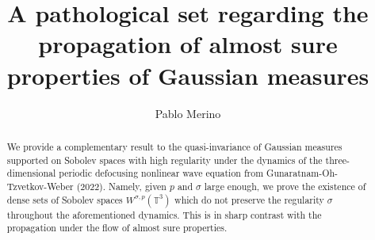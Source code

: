 \documentclass[a4paper, reqno, 11pt]{amsart}
\title[A pathological set for a.s. properties of Gaussian measures]{A pathological set regarding the propagation of almost sure properties of Gaussian measures}
\author{Pablo Merino}
\date{}
\theoremstyle{definition}
\begin{document}
	\maketitle
	
	\begin{abstract}
	We provide a complementary result to the quasi-invariance of Gaussian measures supported on Sobolev spaces with high regularity under the dynamics of the three-dimensional periodic defocusing nonlinear wave equation from Gunaratnam-Oh-Tzvetkov-Weber (2022). Namely, given $p$ and $\sigma$ large enough, we prove the existence of dense sets of Sobolev spaces $W^{\sigma,p}(\mathbb{T}^3)$ which do not preserve the regularity $\sigma$ throughout the aforementioned dynamics. This is in sharp contrast with the propagation under the flow of almost sure properties.
	\end{abstract}
	
	
	
	
\end{document}
